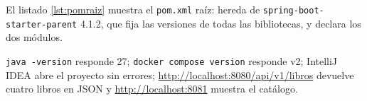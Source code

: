 El listado \ref{lst:pomraiz} muestra el \texttt{pom.xml} raíz: hereda de \texttt{spring-boot-starter-parent} 4.1.2, que fija las versiones de todas las bibliotecas, y declara los dos módulos.



\begin{okBox}[title={Lo que debe quedar funcionando}]
	\texttt{java -version} responde 27; \texttt{docker compose version} responde v2; IntelliJ IDEA abre el proyecto sin errores; \url{http://localhost:8080/api/v1/libros} devuelve cuatro libros en JSON y \url{http://localhost:8081} muestra el catálogo.
\end{okBox}
